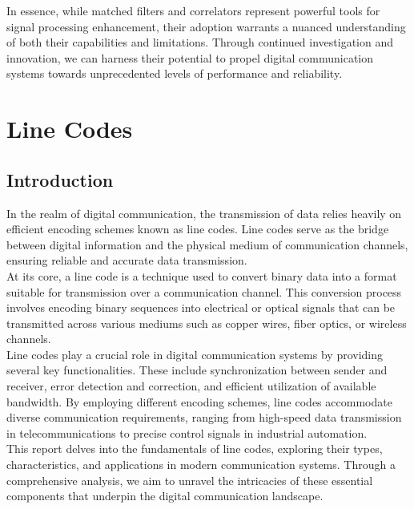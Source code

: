 \documentclass[a4paper, 12pt, english]{article}
\begin{document}
In essence, while matched filters and correlators represent powerful tools for signal processing enhancement, their adoption warrants a nuanced understanding of both their capabilities and limitations. Through continued investigation and innovation, we can harness their potential to propel digital communication systems towards unprecedented levels of performance and reliability. \\



\newpage
\section{Line Codes}
\subsection{Introduction}
In the realm of digital communication, the transmission of data relies heavily on efficient encoding schemes known as line codes. Line codes serve as the bridge between digital information and the physical medium of communication channels, ensuring reliable and accurate data transmission. \\

\noindent At its core, a line code is a technique used to convert binary data into a format suitable for transmission over a communication channel. This conversion process involves encoding binary sequences into electrical or optical signals that can be transmitted across various mediums such as copper wires, fiber optics, or wireless channels. \\

\noindent Line codes play a crucial role in digital communication systems by providing several key functionalities. These include synchronization between sender and receiver, error detection and correction, and efficient utilization of available bandwidth. By employing different encoding schemes, line codes accommodate diverse communication requirements, ranging from high-speed data transmission in telecommunications to precise control signals in industrial automation. \\

\noindent This report delves into the fundamentals of line codes, exploring their types, characteristics, and applications in modern communication systems. Through a comprehensive analysis, we aim to unravel the intricacies of these essential components that underpin the digital communication landscape. \\
\end{document}
